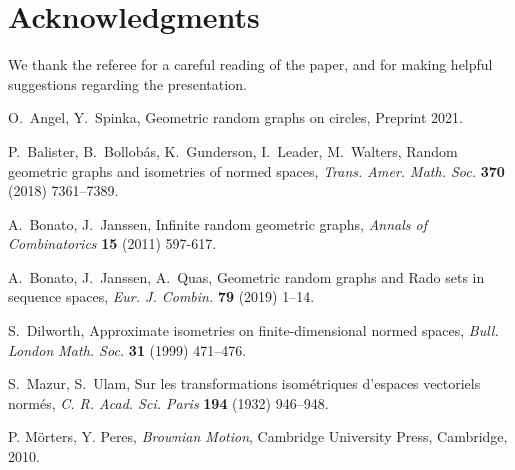 \documentclass{daj}
\begin{document}


%


\section*{Acknowledgments} %
We thank the referee for a careful reading of the paper, and for making helpful suggestions
regarding the presentation.


\begin{thebibliography}{99}

 O.\ Angel, Y.\ Spinka, Geometric random graphs on circles, Preprint 2021.

 P.\ Balister, B.\ Bollob\'{a}s, K.\ Gunderson, I.\ Leader,
M.\ Walters, Random geometric graphs and isometries of normed spaces,
\emph{Trans. Amer. Math. Soc.} \textbf{370} (2018) 7361--7389.

 A.\ Bonato, J.\ Janssen, Infinite random geometric graphs,
\emph{Annals of Combinatorics} \textbf{15} (2011) 597-617.

 A.\ Bonato, J.\ Janssen, A.\ Quas, Geometric random
graphs and Rado sets in sequence spaces, \emph{Eur. J. Combin.} \textbf{79} (2019) 1--14.

 S.\ Dilworth, Approximate isometries on finite-dimensional
normed spaces, \emph{Bull. London Math. Soc.} \textbf{31} (1999) 471--476.

 S.\ Mazur, S.\ Ulam, Sur les transformations isom\'{e}triques
d'espaces vectoriels norm\'{e}s, \emph{C. R. Acad. Sci. Paris} \textbf{194} (1932) 946--948.

 P. M\"orters, Y. Peres, \emph{Brownian Motion},
Cambridge University Press, Cambridge, 2010.

\end{thebibliography}
\end{document}
